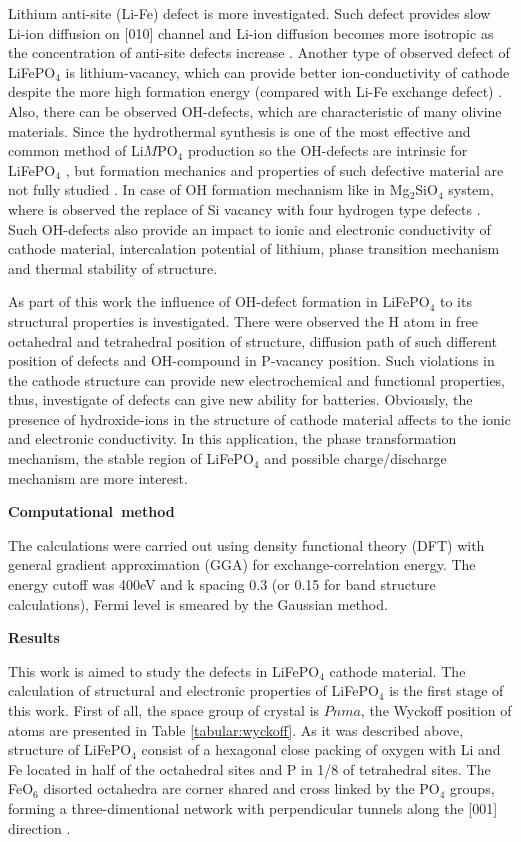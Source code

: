 \documentclass[11pt]{article}
\begin{document}
Lithium anti-site (Li-Fe) defect is more investigated. Such defect provides slow Li-ion diffusion on [010] channel and Li-ion diffusion becomes more isotropic as the concentration of anti-site defects increase \cite{LiFe}. Another type of observed defect of LiFePO$_4$ is lithium-vacancy, which can provide better ion-conductivity of cathode despite the more high formation energy (compared with Li-Fe exchange defect) \cite{Livac}. Also, there can be observed OH-defects, which are characteristic of many olivine materials. Since the hydrothermal synthesis is one of the most effective and common method of Li$M$PO$_4$ production so the OH-defects are intrinsic for LiFePO$_4$ \cite{def}, but formation mechanics and properties of such defective material are not fully studied \cite{def1}. In case of OH formation mechanism like in Mg$_2$SiO$_4$ system, where is observed the replace of Si vacancy with four hydrogen type defects \cite{oh}. Such OH-defects also provide an impact to ionic and electronic conductivity of cathode material, intercalation potential of lithium, phase transition mechanism and thermal stability of structure.

As part of this work the influence of OH-defect formation in LiFePO$_4$ to its structural properties is investigated. There were observed the H atom in free octahedral and tetrahedral position of structure, diffusion path of such different position of defects and OH-compound in P-vacancy position. Such violations in the cathode structure can provide new electrochemical and functional properties, thus, investigate of defects can give new ability for batteries. Obviously, the presence of hydroxide-ions in the structure of cathode material affects to the ionic and electronic conductivity. In this application, the phase transformation mechanism, the stable region of LiFePO$_4$ and possible charge/discharge mechanism are more interest.

\noindent\mbox{\textbf{Computational method}}

The calculations were carried out using density functional theory (DFT) with general gradient approximation (GGA) for exchange-correlation energy. The energy cutoff was 400eV and k spacing 0.3 (or 0.15 for band structure calculations), Fermi level is smeared by the Gaussian method.

\noindent\mbox{\textbf{Results}}

This work is aimed to study the defects in LiFePO$_4$ cathode material. The calculation of structural and electronic properties of LiFePO$_4$ is the first stage of this work. First of all, the space group of crystal is $Pnma$, the Wyckoff position of atoms are presented in Table \ref{tabular:wyckoff}.  As it was described above, structure of LiFePO$_4$ consist of a hexagonal close packing of oxygen with Li and Fe located in half of the octahedral sites and P in 1/8 of tetrahedral sites. The FeO$_6$ disorted octahedra are corner shared and cross linked by the PO$_4$ groups, forming a three-dimentional network with perpendicular tunnels along the [001] direction \cite{morgan}. 
\end{document}
